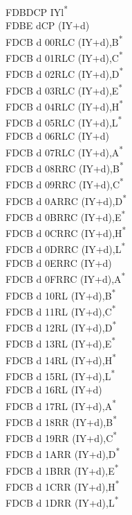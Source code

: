 \documentclass[oneside,a4paper]{book}
\begin{document}
\begin{multicols}{3}
{\begin{tabbing}
FDBD\>CP IYl\textsuperscript{*}\\
FDBE d\>CP (IY+d)\\
FDCB d 00\>RLC (IY+d),B\textsuperscript{*}\\
FDCB d 01\>RLC (IY+d),C\textsuperscript{*}\\
FDCB d 02\>RLC (IY+d),D\textsuperscript{*}\\
FDCB d 03\>RLC (IY+d),E\textsuperscript{*}\\
FDCB d 04\>RLC (IY+d),H\textsuperscript{*}\\
FDCB d 05\>RLC (IY+d),L\textsuperscript{*}\\
FDCB d 06\>RLC (IY+d)\\
FDCB d 07\>RLC (IY+d),A\textsuperscript{*}\\
FDCB d 08\>RRC (IY+d),B\textsuperscript{*}\\
FDCB d 09\>RRC (IY+d),C\textsuperscript{*}\\
FDCB d 0A\>RRC (IY+d),D\textsuperscript{*}\\
FDCB d 0B\>RRC (IY+d),E\textsuperscript{*}\\
FDCB d 0C\>RRC (IY+d),H\textsuperscript{*}\\
FDCB d 0D\>RRC (IY+d),L\textsuperscript{*}\\
FDCB d 0E\>RRC (IY+d)\\
FDCB d 0F\>RRC (IY+d),A\textsuperscript{*}\\
FDCB d 10\>RL (IY+d),B\textsuperscript{*}\\
FDCB d 11\>RL (IY+d),C\textsuperscript{*}\\
FDCB d 12\>RL (IY+d),D\textsuperscript{*}\\
FDCB d 13\>RL (IY+d),E\textsuperscript{*}\\
FDCB d 14\>RL (IY+d),H\textsuperscript{*}\\
FDCB d 15\>RL (IY+d),L\textsuperscript{*}\\
FDCB d 16\>RL (IY+d)\\
FDCB d 17\>RL (IY+d),A\textsuperscript{*}\\
FDCB d 18\>RR (IY+d),B\textsuperscript{*}\\
FDCB d 19\>RR (IY+d),C\textsuperscript{*}\\
FDCB d 1A\>RR (IY+d),D\textsuperscript{*}\\
FDCB d 1B\>RR (IY+d),E\textsuperscript{*}\\
FDCB d 1C\>RR (IY+d),H\textsuperscript{*}\\
FDCB d 1D\>RR (IY+d),L\textsuperscript{*}\\

\end{tabbing}}
\end{multicols}
\end{document}
